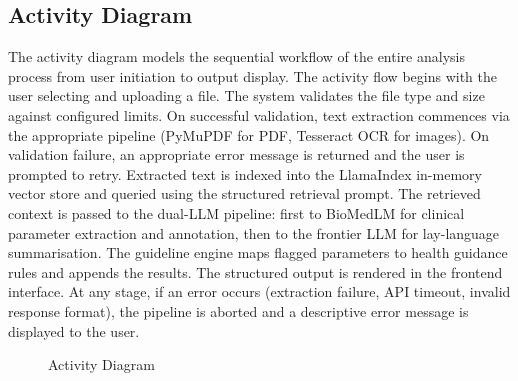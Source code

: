 \documentclass[12pt,a4paper]{report}
\begin{document}
\subsection{Activity Diagram}
The activity diagram models the sequential workflow of the entire analysis process from user initiation to output display. The activity flow begins with the user selecting and uploading a file. The system validates the file type and size against configured limits. On successful validation, text extraction commences via the appropriate pipeline (PyMuPDF for PDF, Tesseract OCR for images). On validation failure, an appropriate error message is returned and the user is prompted to retry. Extracted text is indexed into the LlamaIndex in-memory vector store and queried using the structured retrieval prompt. The retrieved context is passed to the dual-LLM pipeline: first to BioMedLM for clinical parameter extraction and annotation, then to the frontier LLM for lay-language summarisation. The guideline engine maps flagged parameters to health guidance rules and appends the results. The structured output is rendered in the frontend interface. At any stage, if an error occurs (extraction failure, API timeout, invalid response format), the pipeline is aborted and a descriptive error message is displayed to the user.

\begin{figure}[h]
    \centering
    \caption{Activity Diagram}
\end{figure}
\end{document}
